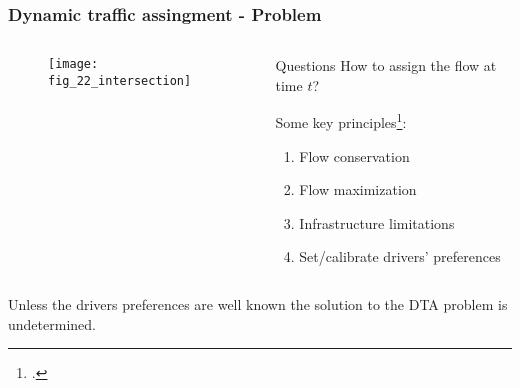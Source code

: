 \begin{frame}
    \frametitle{Dynamic traffic assingment - Problem}
    \begin{columns}
      \begin{column}{0.5\textwidth}
        \begin{figure}
          \texttt{[image: fig\_22\_intersection]}
        \end{figure}
      \end{column}
      \begin{column}{0.5\textwidth}
        \begin{block}{Questions}
          How to assign the flow at time \(t\)?
        \end{block}
        Some key principles\footcite{Coclite:2005}: 
        \begin{enumerate}
          \item Flow conservation 
          \item Flow maximization
          \item Infrastructure limitations
          \item Set/calibrate drivers' preferences
        \end{enumerate}
      \end{column}
    \end{columns}
    Unless the drivers preferences are well known the solution to the DTA problem is undetermined. 
\end{frame}